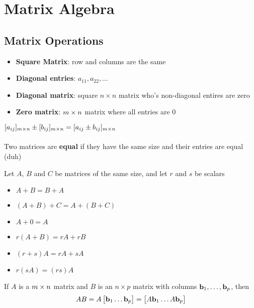 \documentclass{report}
\begin{document}
\chapter{Matrix Algebra}

\section{Matrix Operations}
\begin{itemize}
    \item \textbf{Square Matrix}: row and columns are the same
    \item \textbf{Diagonal entries}: $a_{11}, a_{22}, \ldots$
    \item \textbf{Diagonal matrix}: square $n \times n$ matrix who's non-diagonal entires are zero
    \item \textbf{Zero matrix}: $m \times n$ matrix where all entries are 0
\end{itemize}

$[a_{ij}]_{m \times n} \pm [b_{ij}]_{m \times n} = [a_{ij} \pm b_{ij}]_{m \times n}$
\\\\
Two matrices are \textbf{equal} if they have the same size and their entries are equal (duh)

\setcounter{theorem}{0}
\setcounter{definition}{0}
\begin{theorem}
\end{theorem}
\begin{tcolorbox}[colback=blue!5!white, colframe=blue!75!black, title=Properties of Matrices]
Let $A$, $B$ and $C$ be matrices of the same size, and let $r$ and $s$ be scalars
\begin{itemize}
    \item $A + B = B + A$
    \item $(A + B) + C = A + (B + C)$
    \item $A + 0 = A$
    \item $r(A + B) = rA + rB$
    \item $(r + s)A = rA + sA$
    \item $r(sA) = (rs)A$
\end{itemize}
\end{tcolorbox}

\begin{definition}
    If $A$ is a $m \times n$ matrix and $B$ is an $n \times p$ matrix with columns
$\mathbf{b}_1, \ldots, \mathbf{b}_p$, then 
\[
AB = A\begin{bmatrix}\mathbf{b}_1 \ldots \mathbf{b}_p\end{bmatrix}
    = \begin{bmatrix}A\mathbf{b}_1 \ldots A\mathbf{b}_p\end{bmatrix}
\]
\end{definition}
\end{document}
